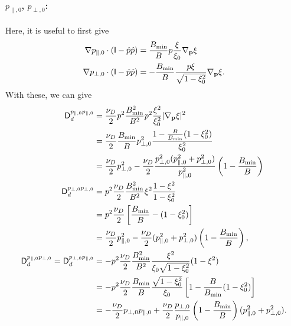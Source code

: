 \documentclass[11pt,a4paper]{article}
\newcommand{\sub}[1]{\ensuremath{_{\text{#1}}}}
\renewcommand{\b}[1]{\ensuremath{ {\bf #1 } }}
\begin{document}
\paragraph{$p_{\parallel,0}$, $p_{\perp,0}$:}
Here, it is useful to first give
\begin{align}
\nabla p_{\parallel,0} \cdot (\mathsf{I}-\hat{p}\hat{p}) &= \frac{B\sub{min}}{B}p\frac{\xi}{\xi_0}\nabla_\b{p}\xi \nonumber \\ %
\nabla p_{\perp,0} \cdot (\mathsf{I}-\hat{p}\hat{p}) &= -\frac{B\sub{min}}{B}\frac{p\xi}{\sqrt{1-\xi_0^2}}\nabla_\b{p}\xi.
\end{align}
With these, we can give 
\begin{align}
\mathsf{D}_d^{p_{\parallel,0}p_{\parallel,0}} &= \frac{\nu_D}{2} p^2 \frac{B\sub{min}^2}{B^2}p^2\frac{\xi^2}{\xi_0^2}|\nabla_\b{p}\xi|^2 \nonumber \\
&=  \frac{\nu_D}{2}\frac{B\sub{min}}{B} p_{\perp,0}^2\frac{1-\frac{B}{B\sub{min}}(1-\xi_0^2)}{\xi_0^2}  \nonumber \\
&=  \frac{\nu_D}{2}p_{\perp,0}^2-  \frac{\nu_D}{2}\frac{p_{\perp,0}^2(p_{\parallel,0}^2+p_{\perp,0}^2)}{p_{\parallel,0}^2}\left(1-\frac{B\sub{min}}{B}\right)  \nonumber \\
\mathsf{D}_d^{p_{\perp,0}p_{\perp,0}} &= p^2 \frac{\nu_D}{2}\frac{B\sub{min}^2}{B^2} \xi^2\frac{1-\xi^2}{1-\xi_0^2} \nonumber \\
&= p^2  \frac{\nu_D}{2}\left[\frac{B\sub{min}}{B}-(1-\xi_0^2)\right] \nonumber \\
&= \frac{\nu_D}{2}p_{\parallel,0}^2 -  \frac{\nu_D}{2}(p_{\parallel,0}^2+p_{\perp,0}^2) \left(1-\frac{B\sub{min}}{B}\right), \nonumber \\
\mathsf{D}_d^{p_{\parallel,0}p_{\perp,0}} = \mathsf{D}_d^{p_{\perp,0}p_{\parallel,0}} &= -p^2 \frac{\nu_D}{2}\frac{B\sub{min}^2}{B^2}\frac{\xi^2}{\xi_0\sqrt{1-\xi_0^2}}(1-\xi^2) \nonumber \\
&= -p^2 \frac{\nu_D}{2}\frac{B\sub{min}}{B}\frac{\sqrt{1-\xi_0^2}}{\xi_0}\left[1-\frac{B}{B\sub{min}}(1-\xi_0^2)\right] \nonumber \\
&=- \frac{\nu_D}{2} p_{\perp,0}p_{\parallel,0} + \frac{\nu_D}{2} \frac{p_{\perp,0}}{p_{\parallel,0}}\left(1-\frac{B\sub{min}}{B}\right)(p_{\parallel,0}^2+p_{\perp,0}^2). \nonumber
\end{align}
\end{document}

